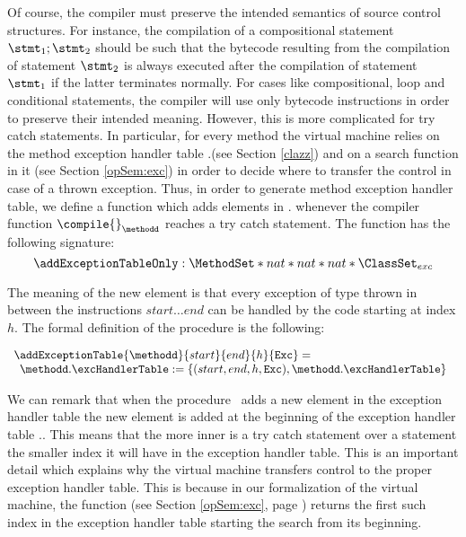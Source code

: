  Of course, the compiler must  preserve the intended semantics of source control structures. For instance,
 the compilation of a compositional statement $\stmt_1;\stmt_2$ should be such that the bytecode resulting from
 the compilation of statement $\stmt_2$ is always executed after the compilation 
 of statement $\stmt_1$ if the latter terminates normally.  For cases like compositional, loop and conditional statements, the compiler will use only bytecode instructions
 in order to preserve their intended meaning. However, this is more complicated for try catch statements. 
 In particular, for every method \methodd{} the virtual machine 
 relies on the method exception handler table  \methodd.\excHandlerTable{}(see Section \ref{clazz}) and on a search function  in it 
\findExcHandlerOnly{}(see Section \ref{opSem:exc})
 in order to decide where  to transfer the control in case of a thrown exception. Thus, in order to generate method exception handler table,
 we define a function \addExceptionTableOnly{} which adds elements in \methodd.\excHandlerTable{} whenever the compiler function $\compile{}_{\methodd}$
 reaches a try catch statement. The function has the following signature:
 $$ \addExceptionTableOnly : \MethodSet *  nat * nat * nat *  \ClassSet_{exc}   $$

 The meaning of the new element is that	every exception of type \Exc{} thrown in between the instructions
 $start \ldots end$ can be handled by the code starting at index $h$.	
 The formal definition of the procedure is the following:

$$ \begin{array}{l}
  \addExceptionTable{\methodd}{ start }{ end  }{ h}{  \mbox{\rm\texttt{Exc}} }  = \\
   \begin{array}{l}
         \methodd.\excHandlerTable := \{ (start, end, h,  \mbox{\rm\texttt{Exc}}   ) , \methodd.\excHandlerTable \}

   \end{array}
\end{array}$$


 We can remark that when the procedure  \addExceptionTableOnly \  adds a new element in the exception handler table the new element is added at the beginning of the 
 exception handler table   \methodd.\excHandlerTable. This means that the more inner is a try catch statement over a statement 
 the smaller index it will have in the exception handler table. This is an important detail which explains why the virtual machine  transfers control to the proper exception
 handler table. This is because in our formalization of the virtual machine, the function  \findExcHandlerOnly{}(see Section \ref{opSem:exc}, page \pageref{opSem:exc})
 returns the first  such index in the exception handler table  \excHandlerTable{} starting the search from its beginning.

